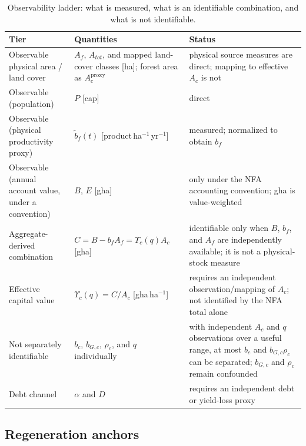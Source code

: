 \documentclass[11pt,a4paper]{article}
\newcommand{\Ups}{\Upsilon_c}
\begin{document}
\begin{table}[htbp]
\centering\small
\caption{Observability ladder: what is measured, what is an identifiable combination, and what is not identifiable.}
\label{tab:si_ladder}
\begin{tabularx}{\textwidth}{>{\raggedright\arraybackslash}p{} X >{\raggedright\arraybackslash}p{}}
\toprule
Tier & Quantities & Status \\
\midrule
Observable physical area / land cover & $A_f$, $A_{tot}$, and mapped land-cover classes [ha]; forest area as $A_c^{\mathrm{proxy}}$ & physical source measures are direct; mapping to effective $A_c$ is not \\
Observable (population) & $P$ [cap] & direct \\
Observable (physical productivity proxy) & $\tilde b_f(t)$ [product\,ha$^{-1}$\,yr$^{-1}$] & measured; normalized to obtain $b_f$ \\
Observable (annual account value, under a convention) & $B$, $E$ [gha] & only under the NFA accounting convention; gha is value-weighted \\
Aggregate-derived combination & $C=B-b_fA_f=\Ups(q)A_c$ [gha] & identifiable only when $B$, $b_f$, and $A_f$ are independently available; it is not a physical-stock measure \\
Effective capital value & $\Ups(q)=C/A_c$ [gha\,ha$^{-1}$] & requires an independent observation/mapping of $A_c$; not identified by the NFA total alone \\
Not separately identifiable & $b_c$, $b_{G,c}$, $\rho_c$, and $q$ individually & with independent $A_c$ and $q$ observations over a useful range, at most $b_c$ and $b_{G,c}\rho_c$ can be separated; $b_{G,c}$ and $\rho_c$ remain confounded \\
Debt channel & $\alpha$ and $D$ & requires an independent debt or yield-loss proxy \\
\bottomrule
\end{tabularx}
\end{table}

\subsection{Regeneration anchors}\label{si:anchors}
\end{document}
